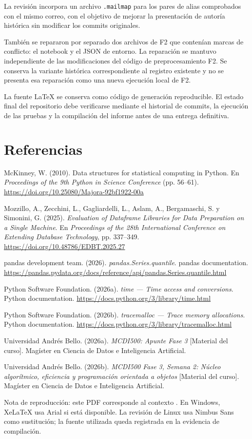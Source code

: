 \documentclass[11pt,letterpaper]{article}
\begin{document}
La revisión incorpora un archivo \texttt{.mailmap} para los pares de alias comprobados con el
mismo correo, con el objetivo de mejorar la presentación de autoría histórica sin modificar los
commits originales.

También se repararon por separado dos archivos de F2 que contenían marcas de conflicto: el
notebook y el JSON de entorno. La reparación se mantuvo independiente de las modificaciones del
código de preprocesamiento F2. Se conserva la variante histórica correspondiente al registro
existente y no se presenta esa reparación como una nueva ejecución local de F2.

La fuente LaTeX se conserva como código de generación reproducible. El estado final del
repositorio debe verificarse mediante el historial de commits, la ejecución de las pruebas y
la compilación del informe antes de una entrega definitiva.
\clearpage
\section{Referencias}
\begin{list}{}{\setlength{\leftmargin}{0.65cm}\setlength{\itemindent}{-0.65cm}\setlength{\itemsep}{9pt}}
\raggedright
\item McKinney, W. (2010). Data structures for statistical computing in Python. En
\textit{Proceedings of the 9th Python in Science Conference} (pp. 56–61).
\url{https://doi.org/10.25080/Majora-92bf1922-00a}
\item Mozzillo, A., Zecchini, L., Gagliardelli, L., Aslam, A., Bergamaschi, S. y Simonini, G. (2025).
\textit{Evaluation of Dataframe Libraries for Data Preparation on a Single Machine}. En
\textit{Proceedings of the 28th International Conference on Extending Database Technology},
pp. 337–349. \url{https://doi.org/10.48786/EDBT.2025.27}
\item pandas development team. (2026). \textit{pandas.Series.quantile}. pandas documentation.
\url{https://pandas.pydata.org/docs/reference/api/pandas.Series.quantile.html}
\item Python Software Foundation. (2026a). \textit{time — Time access and conversions}.
Python documentation. \url{https://docs.python.org/3/library/time.html}
\item Python Software Foundation. (2026b). \textit{tracemalloc — Trace memory allocations}.
Python documentation. \url{https://docs.python.org/3/library/tracemalloc.html}
\item Universidad Andrés Bello. (2026a). \textit{MCDI500: Apunte Fase 3} [Material del curso].
Magíster en Ciencia de Datos e Inteligencia Artificial.
\item Universidad Andrés Bello. (2026b). \textit{MCDI500 Fase 3, Semana 2: Núcleo algorítmico,
eficiencia y programación orientada a objetos} [Material del curso]. Magíster en Ciencia de
Datos e Inteligencia Artificial.
\end{list}
\vfill
{\small Nota de reproducción: este PDF corresponde al contexto \Contexto. En Windows, XeLaTeX
usa Arial si está disponible. La revisión de Linux usa Nimbus Sans como sustitución; la
fuente utilizada queda registrada en la evidencia de compilación.}
\end{document}
